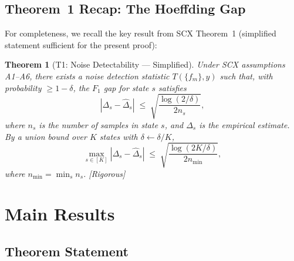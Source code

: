 \documentclass[12pt,a4paper]{article}
\newtheorem{theorem}{Theorem}[section]
\newcommand{\rigorous}{\textcolor{green!50!black}{\small\textsf{[Rigorous]}}}
\newcommand{\gap}{\Delta}
\begin{document}
\subsection{Theorem~1 Recap: The Hoeffding Gap}

For completeness, we recall the key result from \textsf{SCX} Theorem~1 (simplified
statement sufficient for the present proof):

\begin{theorem}[T1: Noise Detectability --- Simplified]
\label{thm:T1-recap}
Under \textsf{SCX} assumptions A1--A6, there exists a noise detection statistic
$T(\{f_m\}, y)$ such that, with probability $\geq 1-\delta$, the $F_1$ gap
for state $s$ satisfies
\begin{equation}\label{eq:T1-hoff}
    |\gap_s - \hat{\gap}_s| \;\leq\; \sqrt{\frac{\log(2/\delta)}{2n_s}},
\end{equation}
where $n_s$ is the number of samples in state $s$, and $\hat{\gap}_s$ is the
empirical estimate.  By a union bound over $K$ states with $\delta \leftarrow \delta/K$,
\begin{equation}\label{eq:T1-uniform}
    \max_{s\in[K]} |\gap_s - \hat{\gap}_s| \;\leq\;
    \sqrt{\frac{\log(2K/\delta)}{2n_{\min}}},
\end{equation}
where $n_{\min} = \min_s n_s$.  \rigorous
\end{theorem}

\section{Main Results}
\label{sec:main}

\subsection{Theorem Statement}
\end{document}
